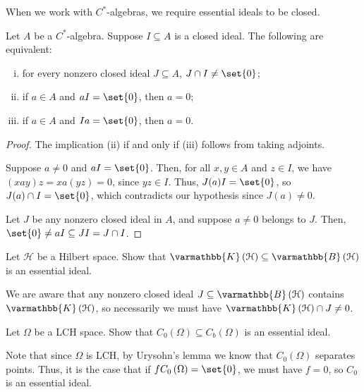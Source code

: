 \documentclass[10pt]{mypackage}
\renewcommand*{\mathbb}[1]{\varmathbb{#1}}
\newcommand{\K}{\mathbb{K}}
\newcommand{\B}{\mathbb{B}}
\begin{document}
When we work with $C^{\ast}$-algebras, we require essential ideals to be closed.
\begin{proposition}
  Let $A$ be a $C^{\ast}$-algebra. Suppose $I\subseteq A$ is a closed ideal. The following are equivalent:
  \begin{enumerate}[(i)]
    \item for every nonzero closed ideal $J\subseteq A$, $J\cap I \neq \set{0}$;
    \item if $a\in A$ and $aI = \set{0}$, then $a = 0$;
    \item if $a\in A$ and $Ia = \set{0}$, then $a = 0$.
  \end{enumerate}
\end{proposition}
\begin{proof}
  The implication (ii) if and only if (iii) follows from taking adjoints.\newline

  Suppose $a\neq 0$ and $aI = \set{0}$. Then, for all $x,y\in A$ and $z\in I$, we have $\left(xay\right)z = xa\left(yz\right) = 0$, since $yz\in I$. Thus, $J(a)I = \set{0}$, so $J(a)\cap I = \set{0}$, which contradicts our hypothesis since $J(a)\neq 0$.\newline

  Let $J$ be any nonzero closed ideal in $A$, and suppose $a\neq 0$ belongs to $J$. Then, $\set{0}\neq aI\subseteq JI = J\cap I$.
\end{proof}
\begin{exercise}
  Let $\mathcal{H}$ be a Hilbert space. Show that $\mathbb{K}\left(\mathcal{H}\right)\subseteq \B\left(\mathcal{H}\right)$ is an essential ideal.
\end{exercise}
\begin{solution}
  We are aware that any nonzero closed ideal $J\subseteq \B\left(\mathcal{H}\right)$ contains $\K\left(\mathcal{H}\right)$, so necessarily we must have $\K\left(\mathcal{H}\right)\cap J \neq 0$.
\end{solution}
\begin{exercise}
  Let $\Omega$ be a LCH space. Show that $C_0\left(\Omega\right)\subseteq C_b\left(\Omega\right)$ is an essential ideal.
\end{exercise}
\begin{solution}
  Note that since $\Omega$ is LCH, by Urysohn's lemma we know that $C_0\left(\Omega\right)$ separates points. Thus, it is the case that if $fC_0\left(\Omega\right) = \set{0}$, we must have $f = 0$, so $C_0$ is an essential ideal.
\end{solution}
\end{document}
